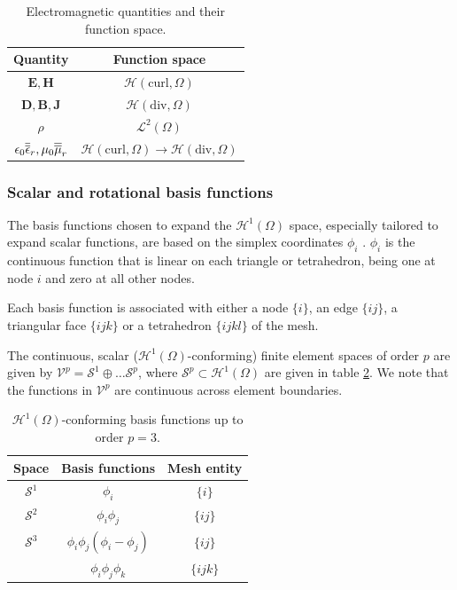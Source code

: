 \begin{table}[h!]
\begin{center}
\begin{tabular}{|c|c|}
\hline 
Quantity & Function space \\ 
\hline
\hline 
$\mathbf{E}, \mathbf{H}$ & $\mathcal{H}(\mathrm{curl},\Omega)$ \\ 
\hline 
$\mathbf{D}, \mathbf{B}, \mathbf{J}$ & $\mathcal{H}(\mathrm{div},\Omega)$ \\ 
\hline 
$\rho$ & $\mathcal{L}^2(\Omega)$ \\ 
\hline 
$\epsilon_0 \overline{\overline{\epsilon}}_r, \mu_0 \overline{\overline{\mu}}_r$ & $\mathcal{H}(\mathrm{curl},\Omega) \longrightarrow \mathcal{H}(\mathrm{div},\Omega)$ \\ 
\hline 
\end{tabular}
\end{center}
\caption{Electromagnetic quantities and their function space.}
\label{tab:quantspace}
\end{table}

\subsubsection{Scalar and rotational basis functions}

The basis functions chosen to expand the $\mathcal{H}^1(\Omega)$ space, especially tailored to expand scalar functions, are based on the simplex coordinates $\phi_i$ \cite{pelosi2009quick}. $\phi_i$ is the continuous function that is linear on each triangle or tetrahedron, being one at node $i$ and zero at all other nodes.

Each basis function is associated with either a node $\lbrace i \rbrace$, an edge $\lbrace ij \rbrace$, a triangular face $\lbrace ijk \rbrace$ or a tetrahedron $\lbrace ijkl \rbrace$ of the mesh.

The continuous, scalar ($\mathcal{H}^1(\Omega)$-conforming) finite element spaces of order $p$ are given by $\mathcal{V}^p = \mathcal{S}^1 \oplus \ldots \mathcal{S}^p$, where $\mathcal{S}^p \subset \mathcal{H}^1(\Omega)$ are given in table \ref{tab:H1functions}. We note that the functions in $\mathcal{V}^p$ are continuous across element boundaries.

\begin{table}[h!]
\begin{center}
\begin{tabular}{|c|c|c|}
\hline 
Space & Basis functions & Mesh entity \\ 
\hline
\hline 
$\mathcal{S}^1$ & $\phi_i$ & $\lbrace i \rbrace$ \\ 
\hline 
$\mathcal{S}^2$ & $\phi_i\phi_j$ & $\lbrace ij \rbrace$ \\ 
\hline 
$\mathcal{S}^3$ & $\phi_i\phi_j(\phi_i - \phi_j)$ & $\lbrace ij \rbrace$ \\ 
 & $\phi_i\phi_j\phi_k$ & $\lbrace ijk \rbrace$ \\ 
\hline 
\end{tabular} 
\end{center}
\caption{$\mathcal{H}^1(\Omega)$-conforming basis functions up to order $p = 3$.}
\label{tab:H1functions}
\end{table}



